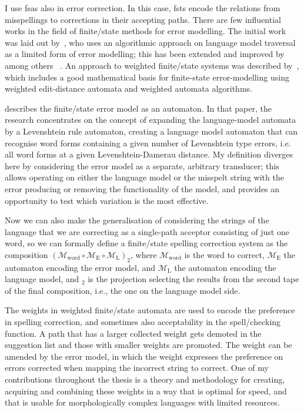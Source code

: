 \documentclass[officiallayout,final]{unihelcompling}
\begin{document}
I use \glspl{fsa} also in error correction. In this case, \glspl{fst} encode
the relations from misspellings to corrections in their accepting paths. There
are few influential works in the field of finite\-/state methods for error
modelling. The initial work was laid out by~\citet{oflazer1996errortolerant},
who uses an algorithmic approach on language model traversal as a limited form
of error modelling; this has been extended and improved by among others
~\citet{hulden2009fast}.  An approach to weighted finite\-/state systems was
described by~\citet{mohri2003edit}, which includes a good mathematical basis
for finite-state error-modelling using weighted edit-distance automata and
weighted automata algorithms. 

\citet{agata2002typographical} describes the finite\-/state error model as an
automaton. In that paper, the research concentrates on the concept of expanding
the language-model automata by a Levenshtein rule automaton, creating a
language model automaton that can recognise word forms containing a given
number of Levenshtein type errors, i.e. all word forms at a given
Levenshtein-Damerau distance. My definition diverges here by considering the
error model as a separate, arbitrary transducer; this allows operating on
either the language model or the misspelt string with the error producing or
removing the functionality of the model, and provides an opportunity to test
which variation is the most effective. 

Now we can also make the generalisation of considering the strings of the
language that we are correcting as a single-path acceptor consisting of just
one word, so we can formally define a finite\-/state spelling correction system
as the composition $(\mathcal{M}_\mathrm{word} \circ \mathcal{M}_\mathrm{E}
\circ \mathcal{M}_\mathrm{L})_2$, where $\mathcal{M}_\mathrm{word}$ is the word
to correct, $\mathcal{M}_\mathrm{E}$ the automaton encoding the error model,
and $\mathcal{M}_\mathrm{L}$ the automaton encoding the language model, and
$_2$ is the projection selecting the results from the second tape of the final
composition, i.e., the one on the language model side.

The weights in weighted finite\-/state automata are used to encode the
preference in spelling correction, and sometimes also acceptability in the
spell\-/checking function. A path that has a larger collected weight gets
demoted in the suggestion list and those with smaller weights are promoted.
The weight can be amended by the error model, in which the weight expresses the
preference on errors corrected when mapping the incorrect string to correct.
One of my contributions throughout the thesis is a theory and methodology for
creating, acquiring and combining these weights in a way that is optimal for
speed, and that is usable for morphologically complex languages with limited
resources.
\end{document}
